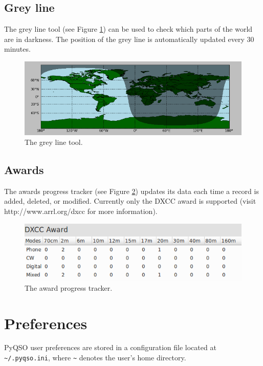 \documentclass[11pt, a4paper]{report}
\begin{document}
\section{Grey line}
The grey line tool (see Figure \ref{fig:grey_line}) can be used to check which parts of the world are in darkness. The position of the grey line is automatically updated every 30 minutes.

\begin{figure}
  \centering
  \includegraphics[width=1\columnwidth]{images/grey_line.png}
  \caption{The grey line tool.}
  \label{fig:grey_line}
\end{figure}

\section{Awards}
The awards progress tracker (see Figure \ref{fig:awards}) updates its data each time a record is added, deleted, or modified. Currently only the DXCC award is supported (visit http://www.arrl.org/dxcc for more information).

\begin{figure}
  \centering
  \includegraphics[width=1\columnwidth]{images/awards.png}
  \caption{The award progress tracker.}
  \label{fig:awards}
\end{figure}

\chapter{Preferences}\label{chap:preferences}
PyQSO user preferences are stored in a configuration file located at \texttt{\textasciitilde/.pyqso.ini}, where \texttt{\textasciitilde} denotes the user's home directory.
\end{document}
